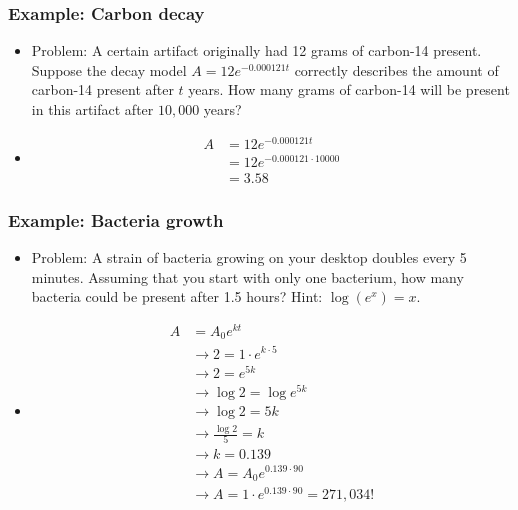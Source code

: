 \documentclass[xcolor=dvipsnames, 9pt]{beamer} %
\begin{document}
\begin{frame}
\frametitle{Example: Carbon decay}
\begin{itemize}
\item Problem: A certain artifact originally had 12 grams of carbon-14 present.  Suppose the decay model $A = 12e^{-0.000121t}$ correctly describes the amount of carbon-14 present after $t$ years.  How many grams of carbon-14 will be present in this artifact after $10,000$ years? 
\item[] \begin{align*}
A 
&= 12e^{-0.000121t} \\
&= 12e^{-0.000121 \cdot 10000} \\
&= 3.58
\end{align*}
\end{itemize}
\end{frame}

\begin{frame}
\frametitle{Example: Bacteria growth}
\begin{itemize}
\item Problem: A strain of bacteria growing on your desktop doubles every 5 minutes. Assuming that you start with only one bacterium, how many bacteria could be present after 1.5 hours? Hint: $ \log(e^x) = x$.
\item[] \begin{align*}
A
&= A_0 e^{kt} \\
&\rightarrow 2 = 1\cdot e^{k \cdot 5} \\
&\rightarrow 2 = e^{5k} \\
&\rightarrow \log 2 = \log e^{5k} \\
&\rightarrow \log 2 = 5k \\
&\rightarrow \frac{\log 2}{5} = k\\
&\rightarrow k = 0.139 \\
&\rightarrow A = A_0e^{0.139 \cdot 90} \\
&\rightarrow A = 1 \cdot e^{0.139 \cdot 90} = 271,034!
\end{align*}
\end{itemize}
\end{frame}
\end{document}
